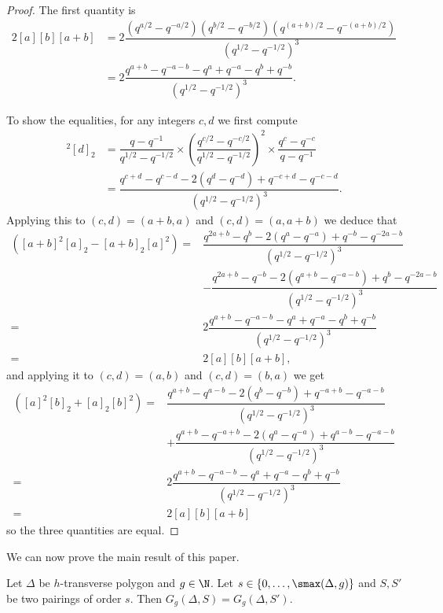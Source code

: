 \begin{proof}
The first quantity is
\begin{align*}
2[a][b][a+b] &= 2 \dfrac{(q^{a/2}-q^{-a/2}) (q^{b/2}-q^{-b/2}) (q^{(a+b)/2}-q^{-(a+b)/2})}{(q^{1/2}-q^{-1/2})^3}  \\
  &= 2 \dfrac{ q^{a+b} - q^{-a-b} -q^a + q^{-a} -q^b +q^{-b} }{(q^{1/2}-q^{-1/2})^3}.
\end{align*}

To show the equalities, for any integers $c,d$ we first compute
\begin{align*}
[2][c]^2[d]_2 &= \dfrac{q-q^{-1}}{q^{1/2}-q^{-1/2}} \times \left(\dfrac{q^{c/2}-q^{-c/2}}{q^{1/2}-q^{-1/2}}\right)^2 \times \dfrac{q^c-q^{-c}}{q-q^{-1}}  \\
  &= \dfrac{q^{c+d} - q^{c-d} - 2(q^d-q^{-d}) + q^{-c+d} - q^{-c-d}}{(q^{1/2}-q^{-1/2})^3}.
\end{align*}
Applying this to $(c,d) = (a+b,a)$ and $(c,d) = (a,a+b)$ we deduce that
\begin{align*}
 [2]\left([a+b]^2[a]_2 - [a+b]_2[a]^2\right) 
    ={} &   \dfrac{q^{2a+b} - q^b- 2(q^a-q^{-a}) + q^{-b} - q^{-2a-b}}{(q^{1/2}-q^{-1/2})^3} \\
    & - \dfrac{q^{2a+b} - q^{-b} - 2(q^{a+b}-q^{-a-b}) + q^b - q^{-2a-b}}{(q^{1/2}-q^{-1/2})^3} \\
    ={} & 2 \dfrac{ q^{a+b} - q^{-a-b} -q^a + q^{-a} -q^b +q^{-b} }{(q^{1/2}-q^{-1/2})^3} \\
    ={} & 2[a][b][a+b],
\end{align*}
and applying it to $(c,d) = (a,b)$ and $(c,d) = (b,a)$ we get
\begin{align*}
[2]\left([a]^2[b]_2 + [a]_2[b]^2\right) 
    ={} &  \dfrac{q^{a+b} - q^{a-b} - 2(q^b-q^{-b}) + q^{-a+b} - q^{-a-b}}{(q^{1/2}-q^{-1/2})^3} \\
    & + \dfrac{q^{a+b} - q^{-a+b} - 2(q^a-q^{-a}) + q^{a-b} - q^{-a-b}}{(q^{1/2}-q^{-1/2})^3} \\
    ={} & 2 \dfrac{ q^{a+b} - q^{-a-b} -q^a + q^{-a} -q^b +q^{-b} }{(q^{1/2}-q^{-1/2})^3} \\
    ={} & 2[a][b][a+b] 
\end{align*}
so the three quantities are equal.
\end{proof}


We can now prove the main result of this paper.

\begin{theo} \label{theo-invS}
Let $\Delta$ be $h$-transverse polygon and $g\in\N$. Let $s\in \{0,\dots,\smax(\Delta,g)\}$ and $S,S'$ be two pairings of order $s$. Then $G_g(\Delta,S) = G_g(\Delta,S')$.
\end{theo}

